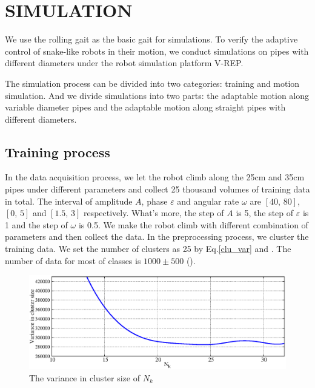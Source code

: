 \section{SIMULATION}
We use the rolling gait as the basic gait for simulations. To verify the adaptive control of snake-like robots in their motion, we conduct simulations on pipes with different diameters under the robot simulation platform V-REP.

The simulation process can be divided into two categories: training and motion simulation. And we divide simulations into two parts: the adaptable motion along variable diameter pipes and the adaptable motion along straight pipes with different diameters.

\subsection{Training process}

In the data acquisition process, we let the robot climb along the 25cm and 35cm pipes under different parameters and collect 25 thousand volumes of training data in total. The interval of amplitude $A$, phase $\varepsilon$ and angular rate $\omega$ are $[40, \, 80]$, $[0, \, 5]$ and $[1.5, \, 3]$ respectively. What's more, the step of $A$ is 5, the step of $\varepsilon$ is 1 and the step of $\omega$ is 0.5. We make the robot climb with different combination of parameters and then collect the data. In the preprocessing process, we cluster the training data. We set the number of clusters as 25 by Eq.\ref{clu_var} and . The number of data for most of classes is $1000 \pm 500 $ ().

\begin{figure}[!h]
	\centering
	\includegraphics[width=0.8\linewidth]{fig/experiment/170912/clusize}
	\caption{The variance in cluster size of $N_{k}$}
\end{figure}

